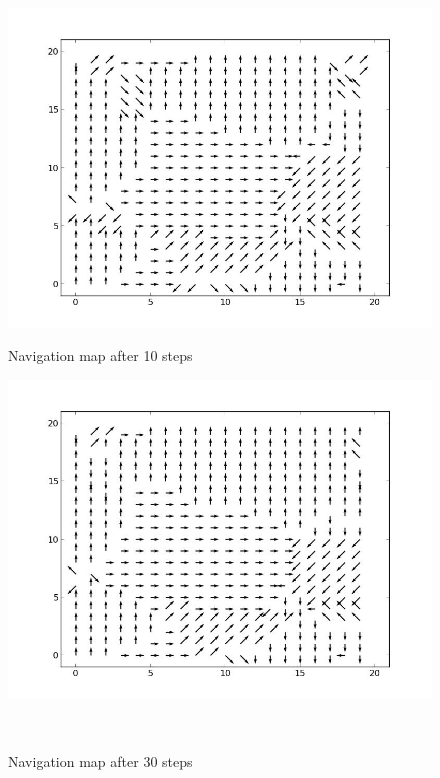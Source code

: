 \documentclass[a4paper, 12pt]{article}
\begin{document}
\begin{figure}
  \centering
  \begin{minipage}[c]{0.5\textwidth}
    \centering
    \includegraphics[scale=0.3]{../figure/navMp10.jpeg}
      \caption{Navigation map after 10 steps}
  \end{minipage}%
  \begin{minipage}[c]{0.5\textwidth}
    \centering
    \includegraphics[scale=0.3]{../figure/navMp30.jpeg}
      \caption{Navigation map after 30 steps}
    \end{minipage}
    \\
  \centering
  \begin{minipage}[c]{0.5\textwidth}
    \centering

\end{minipage}
\end{figure}
\end{document}
